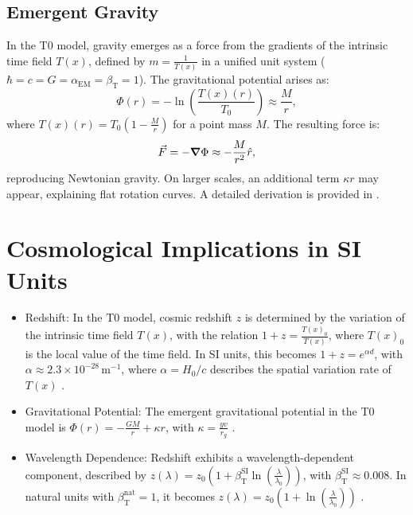 \documentclass[12pt,a4paper]{article}
\newcommand{\Tfield}{T(x)}
\newcommand{\betaT}{\beta_{\text{T}}}
\newcommand{\alphaEM}{\alpha_{\text{EM}}}
\newcommand{\Tzero}{T_0}
\begin{document}
	\subsection{Emergent Gravity}
	In the T0 model, gravity emerges as a force from the gradients of the intrinsic time field \(\Tfield\), defined by \( m = \frac{1}{\Tfield} \) in a unified unit system (\(\hbar = c = G = \alphaEM = \betaT = 1\)). The gravitational potential arises as:
	\begin{equation}
		\Phi(r) = -\ln\left(\frac{\Tfield(r)}{\Tzero}\right) \approx \frac{M}{r},
	\end{equation}
	where \(\Tfield(r) = \Tzero \left(1 - \frac{M}{r}\right)\) for a point mass \(M\). The resulting force is:
	\begin{equation}
		\vec{F} = -\grad \Phi \approx -\frac{M}{r^2} \hat{r},
	\end{equation}
	reproducing Newtonian gravity. On larger scales, an additional term \(\kappa r\) may appear, explaining flat rotation curves. A detailed derivation is provided in \cite{pascher_emergente_gravitation_2025, pascher_alphabeta_2025}.
	
	\section{Cosmological Implications in SI Units}
	\begin{itemize}
		\item Redshift: In the T0 model, cosmic redshift \(z\) is determined by the variation of the intrinsic time field \(\Tfield\), with the relation \(1 + z = \frac{\Tfield_0}{\Tfield}\), where \(\Tfield_0\) is the local value of the time field. In SI units, this becomes \(1 + z = e^{\alpha d}\), with \(\alpha \approx 2.3 \times 10^{-28} \, \text{m}^{-1}\), where \(\alpha = H_0/c\) describes the spatial variation rate of \(\Tfield\) \cite{pascher_galaxies_2025, pascher_emergente_gravitation_2025}.
		\item Gravitational Potential: The emergent gravitational potential in the T0 model is \(\Phi(r) = -\frac{GM}{r} + \kappa r\), with \(\kappa = \frac{y v}{r_g}\) \cite{pascher_emergente_gravitation_2025}.
		\item Wavelength Dependence: Redshift exhibits a wavelength-dependent component, described by \(z(\lambda) = z_0 \left(1 + \betaT^{\text{SI}} \ln\left(\frac{\lambda}{\lambda_0}\right)\right)\), with \(\betaT^{\text{SI}} \approx 0.008\). In natural units with \(\betaT^{\text{nat}} = 1\), it becomes \(z(\lambda) = z_0 \left(1 + \ln\left(\frac{\lambda}{\lambda_0}\right)\right)\) \cite{pascher_temp_2025, pascher_alphabeta_2025}.
	\end{itemize}
	
\end{document}
